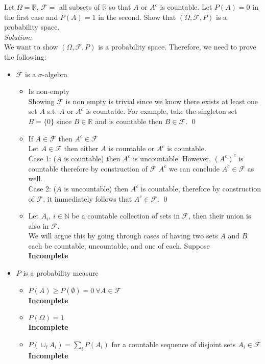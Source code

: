 \documentclass[10pt]{amsart}
\begin{document}
Let $\Omega=\mathds{R}$, $\mathcal{F}=$ all subsets of $\mathds{R}$ so that $A$ or $A^c$ is countable.
Let $P(A)=0$ in the first case and $P(A)=1$ in the second.
Show that $(\Omega, \mathcal{F}, P)$ is a probability space. \\
\textit{Solution:} \\
We want to show $(\Omega, \mathcal{F}, P)$ is a probability space. Therefore, we need to prove the following:
\begin{itemize}
\item $\mathcal{F}$ is a $\sigma$-algebra
	\begin{itemize}
		\item Is non-empty \\
		Showing $\mathcal{F}$ is non empty is trivial since we know there exists at least one set $A$ s.t. $A$ or $A^c$ is countable.
		For example, take the singleton set $B = \{0\}$ since $B \in \mathbb{R}$ and is countable then $B \in \mathcal{F}$. \qed
		\item If $A \in \mathcal{F}$ then $A^c \in \mathcal{F}$ \\
		Let $A \in \mathcal{F}$ then either $A$ is countable or $A^c$ is countable. \\
		Case 1: ($A$ is countable) then $A^c$ is uncountable. 
		However, $(A^c)^c$ is countable therefore by construction of $\mathcal{F}$ $A^c$ we can conclude $A^c \in \mathcal{F}$ as well. \\
		Case 2: ($A$ is uncountable) then $A^c$ is countable, therefore by construction of $\mathcal{F}$, it immediately follows that $A^c \in \mathcal{F}$. \qed
		\item Let $A_i$, $i \in \mathbb{N}$ be a countable collection of sets in $\mathcal{F}$, then their union is also in $\mathcal{F}$. \\
		We will argue this by going through cases of having two sets $A$ and $B$ each be countable, uncountable, and one of each. Suppose \\
		\textbf{Incomplete}
	\end{itemize}
\item $P$ is a probability measure
	\begin{itemize}
		\item $P(A) \geq P(\emptyset) = 0 \: \forall A \in \mathcal{F}$ \\
		\textbf{Incomplete}
		\item $P(\Omega) = 1$ \\
		\textbf{Incomplete}
		\item $P(\cup_i A_i) = \sum_i P(A_i)$ for a countable sequence of disjoint sets $A_i \in \mathcal{F}$ \\
		\textbf{Incomplete}
	\end{itemize}
\end{itemize}
\end{document}
